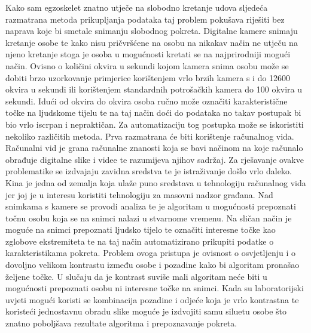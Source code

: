 \documentclass[times, utf8, diplomski]{fer}
\begin{document}
Kako sam egzoskelet znatno utječe na slobodno kretanje udova sljedeća razmatrana metoda prikupljanja podataka taj problem pokušava riješiti
bez naprava koje bi smetale snimanju slobodnog pokreta. Digitalne kamere snimaju kretanje osobe te kako nisu pričvršćene na osobu
na nikakav način ne utječu na njeno kretanje stoga je osoba u mogućnosti kretati se na najprirodniji mogući način. Ovisno o količini
okvira u sekundi kojom kamera snima osobu može se dobiti brzo uzorkovanje primjerice korištenjem vrlo brzih kamera s i do
12600 okvira u sekundi ili korištenjem standardnih potrošačkih kamera do 100 okvira u sekundi. Idući od okvira do okvira osoba ručno
može označiti karakteristične točke na ljudskome tijelu te na taj način doći do podataka no takav postupak bi bio vrlo iscrpan i
nepraktičan. Za automatizaciju tog postupka može se iskoristiti nekoliko različitih metoda. Prva razmatrana će biti korištenje
računalnog vida. Računalni vid je grana računalne znanosti koja se bavi načinom na koje računalo obrađuje digitalne slike i videe 
te razumijeva njihov sadržaj. Za rješavanje ovakve problematike se izdvajaju zavidna sredstva te je istraživanje došlo vrlo daleko.
Kina je jedna od zemalja koja ulaže puno sredstava u tehnologiju računalnog vida jer joj je u interesu koristiti tehnologiju za 
masovni nadzor građana. Nad snimkama s kamere se provodi analiza te je algoritam u mogućnosti prepoznati točnu osobu koja se na 
snimci nalazi u stvarnome vremenu. Na sličan način je moguće na snimci prepoznati ljudsko tijelo te označiti interesne točke kao zglobove ekstremiteta
te na taj način automatizirano prikupiti podatke o karakteristikama pokreta. Problem ovoga pristupa je ovisnost o osvjetljenju i o
dovoljno velikom kontrastu između osobe i pozadine kako bi algoritam pronašao željene točke. U slučaju da je kontrast suviše mali 
algoritam neće biti u mogućnosti prepoznati osobu ni interesne točke na snimci. Kada su laboratorijski uvjeti mogući koristi se
kombinacija pozadine i odjeće koja je vrlo kontrastna te koristeći jednostavnu obradu slike moguće je izdvojiti samu siluetu osobe
što znatno poboljšava rezultate algoritma i prepoznavanje pokreta.
\end{document}

